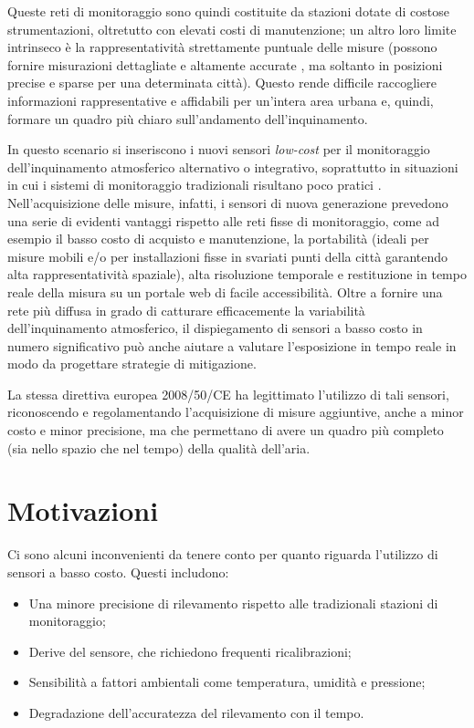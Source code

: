 Queste reti di monitoraggio sono quindi costituite da stazioni dotate di costose strumentazioni, oltretutto con elevati costi di manutenzione; un altro loro limite intrinseco è la rappresentatività strettamente puntuale delle misure (possono fornire misurazioni dettagliate e altamente accurate \cite{MEAD2013186}, ma soltanto in posizioni precise e sparse per una determinata città). \cite{s16050710}
Questo rende difficile raccogliere informazioni rappresentative e affidabili per un'intera area urbana e, quindi, formare un quadro più chiaro sull'andamento dell'inquinamento. \cite{s16050710}

In questo scenario si inseriscono i nuovi sensori \textit{low-cost} per il monitoraggio dell’inquinamento atmosferico alternativo o integrativo, soprattutto in situazioni in cui i sistemi di monitoraggio tradizionali risultano poco pratici \cite{doi:10.1021/es4022602}. Nell’acquisizione delle misure, infatti, i sensori di nuova generazione prevedono una serie di evidenti vantaggi rispetto alle reti fisse di monitoraggio, come ad esempio il basso costo di acquisto e manutenzione, la portabilità (ideali per misure mobili e/o per installazioni fisse in svariati punti della città garantendo alta rappresentatività spaziale), alta risoluzione temporale e restituzione in tempo reale della misura su un portale web di facile accessibilità. \cite{relazione_alice}
Oltre a fornire una rete più diffusa in grado di catturare efficacemente la variabilità dell'inquinamento atmosferico, il dispiegamento di sensori a basso costo in numero significativo può anche aiutare a valutare l'esposizione in tempo reale in modo da progettare strategie di mitigazione. \cite{KUMAR2015199}

La stessa direttiva europea 2008/50/CE ha legittimato l’utilizzo di tali sensori, riconoscendo e regolamentando l’acquisizione di misure aggiuntive, anche a minor costo e minor precisione, ma che permettano di avere un quadro più completo (sia nello spazio che nel tempo) della qualità dell’aria. \cite{relazione_alice}

\section{Motivazioni}\label{sec:motivazoni}
Ci sono alcuni inconvenienti da tenere conto per quanto riguarda l'utilizzo di sensori a basso costo. Questi includono: 
\begin{itemize}
  \item Una minore precisione di rilevamento rispetto alle tradizionali stazioni di monitoraggio; \cite{s17112478}
  \item Derive del sensore, che richiedono frequenti ricalibrazioni;
  \item Sensibilità a fattori ambientali come temperatura, umidità e pressione;
  \item Degradazione dell'accuratezza del rilevamento con il tempo. \cite{s18092843}
\end{itemize}

